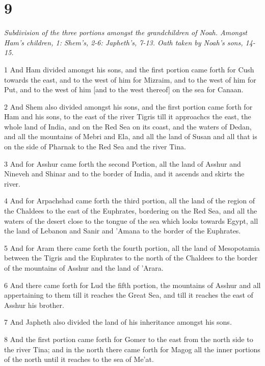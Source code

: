 \chapter{9}

\par \textit{Subdivision of the three portions amongst the grandchildren of Noah. Amongst Ham's children, 1: Shem's, 2-6: Japheth's, 7-13. Oath taken by Noah's sons, 14-15.}

\par 1 And Ham divided amongst his sons, and the first portion came forth for Cush towards the east, and to the west of him for Mizraim, and to the west of him for Put, and to the west of him [and to the west thereof] on the sea for Canaan.
\par 2 And Shem also divided amongst his sons, and the first portion came forth for Ham and his sons, to the east of the river Tigris till it approachcs the east, the whole land of India, and on the Red Sea on its coast, and the waters of Dedan, and all the mountains of Mebri and Ela, and all the land of Susan and all that is on the side of Pharnak to the Red Sea and the river Tina.
\par 3 And for Asshur came forth the second Portion, all the land of Asshur and Nineveh and Shinar and to the border of India, and it ascends and skirts the river.
\par 4 And for Arpachshad came forth the third portion, all the land of the region of the Chaldees to the east of the Euphrates, bordering on the Red Sea, and all the waters of the desert close to the tongue of the sea which looks towards Egypt, all the land of Lebanon and Sanir and 'Amana to the border of the Euphrates.
\par 5 And for Aram there came forth the fourth portion, all the land of Mesopotamia between the Tigris and the Euphrates to the north of the Chaldees to the border of the mountains of Asshur and the land of 'Arara.
\par 6 And there came forth for Lud the fifth portion, the mountains of Asshur and all appertaining to them till it reaches the Great Sea, and till it reaches the east of Asshur his brother.
\par 7 And Japheth also divided the land of his inheritance amongst his sons.
\par 8 And the first portion came forth for Gomer to the east from the north side to the river Tina; and in the north there came forth for Magog all the inner portions of the north until it reaches to the sea of Me'at.
